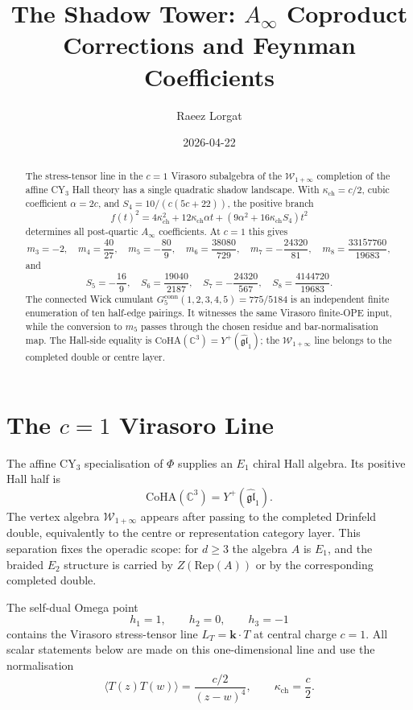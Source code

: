 \documentclass[11pt]{article}
\title{The Shadow Tower: $A_\infty$ Coproduct Corrections and Feynman Coefficients}
\author{Raeez Lorgat}
\date{2026-04-22}
\begin{document}
\maketitle

\begin{abstract}
The stress-tensor line in the $c=1$ Virasoro subalgebra of the
$\mathcal W_{1+\infty}$ completion of the affine CY$_3$ Hall theory has
a single quadratic shadow landscape. With
$\kappa_{\mathrm{ch}}=c/2$, cubic coefficient $\alpha=2c$, and
$S_4=10/(c(5c+22))$, the positive branch
\[
  f(t)^2
  =
  4\kappa_{\mathrm{ch}}^2
  +12\kappa_{\mathrm{ch}}\alpha t
  +(9\alpha^2+16\kappa_{\mathrm{ch}}S_4)t^2
\]
determines all post-quartic $A_\infty$ coefficients. At $c=1$ this
gives
\[
  m_3=-2,\quad m_4=\frac{40}{27},\quad
  m_5=-\frac{80}{9},\quad m_6=\frac{38080}{729},\quad
  m_7=-\frac{24320}{81},\quad
  m_8=\frac{33157760}{19683},
\]
and
\[
  S_5=-\frac{16}{9},\quad S_6=\frac{19040}{2187},\quad
  S_7=-\frac{24320}{567},\quad
  S_8=\frac{4144720}{19683}.
\]
The connected Wick cumulant
$G_5^{\mathrm{conn}}(1,2,3,4,5)=775/5184$ is an independent finite
enumeration of ten half-edge pairings. It witnesses the same Virasoro
finite-OPE input, while the conversion to $m_5$ passes through the
chosen residue and bar-normalisation map. The Hall-side equality is
$\mathrm{CoHA}(\mathbb C^3)=Y^+(\widehat{\mathfrak{gl}}_1)$; the
$\mathcal W_{1+\infty}$ line belongs to the completed double or centre
layer.
\end{abstract}

\section{The $c=1$ Virasoro Line}

The affine CY$_3$ specialisation of $\Phi$ supplies an $E_1$ chiral
Hall algebra. Its positive Hall half is
\[
  \mathrm{CoHA}(\mathbb C^3)=Y^+(\widehat{\mathfrak{gl}}_1).
\]
The vertex algebra $\mathcal W_{1+\infty}$ appears after passing to the
completed Drinfeld double, equivalently to the centre or representation
category layer. This separation fixes the operadic scope: for $d\geq3$
the algebra $A$ is $E_1$, and the braided $E_2$ structure is carried by
$Z(\mathrm{Rep}(A))$ or by the corresponding completed double.

The self-dual Omega point
\[
  h_1=1,\qquad h_2=0,\qquad h_3=-1
\]
contains the Virasoro stress-tensor line
$L_T=\mathbf{k}\cdot T$ at central charge $c=1$. All scalar statements
below are made on this one-dimensional line and use the normalisation
\[
  \langle T(z)T(w)\rangle=\frac{c/2}{(z-w)^4},\qquad
  \kappa_{\mathrm{ch}}=\frac c2.
\]
\end{document}
